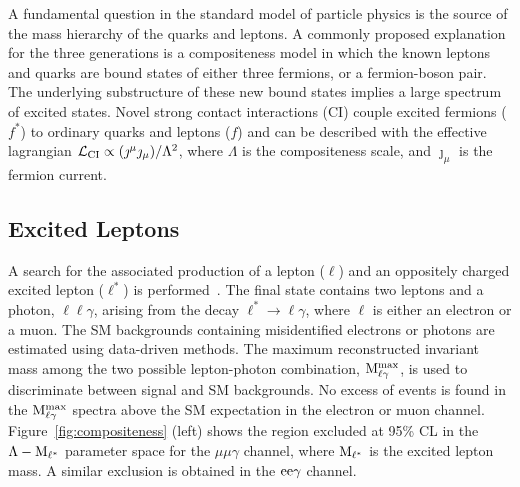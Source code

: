 \documentclass[11pt]{article}
\begin{document}
A fundamental question in the standard model of particle physics is the source of the 
mass hierarchy of the quarks and leptons. A commonly proposed explanation for the three 
generations is a compositeness model in which the known leptons and quarks are bound states 
of either three fermions, or a fermion-boson pair. The underlying substructure of these new 
bound states implies a large spectrum of excited states. Novel strong contact interactions (CI) 
couple excited fermions ($f^{\ast}$) to ordinary quarks and leptons ($f$) and can be described 
with the effective lagrangian $\mathcal{L}_{\rm{CI}} \propto (\jmath^\mu \jmath_\mu) / \Lambda^{2} $, 
where $\Lambda$ is the compositeness scale, and $\jmath_\mu$ is the fermion current. 

\subsection{Excited Leptons}
A search for the associated production of a lepton ($\ell$) and an oppositely 
charged excited lepton ($\ell^{\ast}$) is performed~\cite{CMSPAPER:EXO-10-016}. 
The final state contains two leptons and a photon, $\ell\ell\gamma$, arising 
from the decay $\ell^{\ast} \rightarrow \ell \gamma$, where $\ell$ is either an electron or a muon.
The SM backgrounds containing misidentified electrons or photons are estimated using 
data-driven methods. The maximum reconstructed invariant mass among the 
two possible lepton-photon combination, $\rm{M}^{max}_{\ell\gamma}$,
is used to discriminate between signal and SM backgrounds.
No excess of events is found in the $\rm{M}^{max}_{\ell\gamma}$ spectra 
above the SM expectation in the electron or muon channel. Figure~\ref{fig:compositeness} (left) 
shows the region excluded at 95\% CL in the $\Lambda - \rm{M}_{\ell^{\ast}}$ parameter space for 
the $\mu\mu\gamma$ channel, where $\rm{M}_{\ell^{\ast}}$ is the excited lepton mass.
A similar exclusion is obtained in the $\rm{ee}\gamma$ channel.
\end{document}
